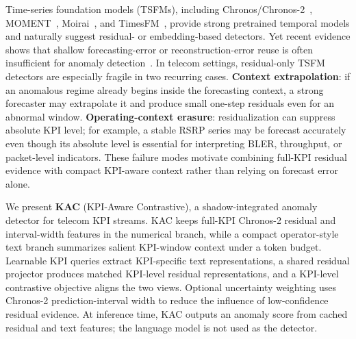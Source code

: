 \documentclass[conference]{IEEEtran}
\begin{document}
Time-series foundation models (TSFMs), including Chronos/Chronos-2~\cite{ansari2024chronos,ansari2025chronos2}, MOMENT~\cite{goswami2024moment}, Moirai~\cite{woo2024moirai}, and TimesFM~\cite{das2024timesfm}, provide strong pretrained temporal models and naturally suggest residual- or embedding-based detectors. Yet recent evidence shows that shallow forecasting-error or reconstruction-error reuse is often insufficient for anomaly detection~\cite{zhu2026oneliners}. In telecom settings, residual-only TSFM detectors are especially fragile in two recurring cases. \textbf{Context extrapolation}: if an anomalous regime already begins inside the forecasting context, a strong forecaster may extrapolate it and produce small one-step residuals even for an abnormal window. \textbf{Operating-context erasure}: residualization can suppress absolute KPI level; for example, a stable RSRP series may be forecast accurately even though its absolute level is essential for interpreting BLER, throughput, or packet-level indicators. These failure modes motivate combining full-KPI residual evidence with compact KPI-aware context rather than relying on forecast error alone.

We present \textbf{KAC} (KPI-Aware Contrastive), a shadow-integrated anomaly detector for telecom KPI streams. KAC keeps full-KPI Chronos-2 residual and interval-width features in the numerical branch, while a compact operator-style text branch summarizes salient KPI-window context under a token budget. Learnable KPI queries extract KPI-specific text representations, a shared residual projector produces matched KPI-level residual representations, and a KPI-level contrastive objective aligns the two views. Optional uncertainty weighting uses Chronos-2 prediction-interval width to reduce the influence of low-confidence residual evidence. At inference time, KAC outputs an anomaly score from cached residual and text features; the language model is not used as the detector.
\end{document}
